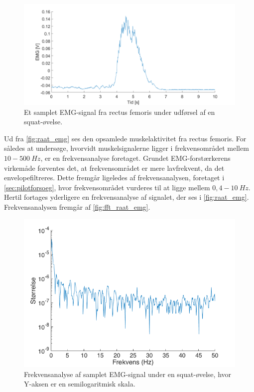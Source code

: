 \begin{figure}[H]
\centering
\includegraphics[width=1\textwidth]{figures/raat_EMG_test}
\caption{Et samplet EMG-signal fra rectus femoris under udførsel af en squat-øvelse.}
\label{fig:raat_emg}
\end{figure}

\noindent
Ud fra \autoref{fig:raat_emg} ses den opsamlede muskelaktivitet fra rectus femoris. 
For således at undersøge, hvorvidt muskelsignalerne ligger i frekvensområdet mellem $10-500~Hz$, er en frekvensanalyse foretaget. 
Grundet EMG-forstærkerens virkemåde forventes det, at frekvensområdet er mere lavfrekvent, da det envelopefiltreres. 
Dette fremgår ligeledes af frekvensanalysen, foretaget i \autoref{sec:pilotforsoeg}, hvor frekvensområdet vurderes til at ligge mellem $0,4-10~Hz$. 
Hertil fortages yderligere en frekvensanalyse af signalet, der ses i \autoref{fig:raat_emg}. Frekvensanalysen fremgår af \autoref{fig:fft_raat_emg}.

\begin{figure}[H]
\centering
\includegraphics[width=1\textwidth]{figures/fft_raat_EMG}
\caption{Frekvensanalyse af samplet EMG-signal under en squat-øvelse, hvor Y-aksen er en semilogaritmisk skala.}
\label{fig:fft_raat_emg}
\end{figure}

